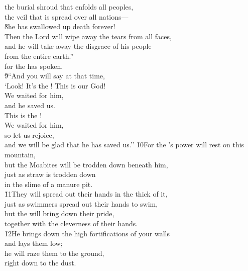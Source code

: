 \begin{poetry}
\poemll    the burial shroud that enfolds all peoples, \\
\poeml the veil that is spread over all nations--- \\
\poeml \v{8}he has swallowed up death forever! \\
\poeml Then the Lord  will wipe away the tears from all faces, \\
\poemll    and he will take away the disgrace of his people \\
\poemlll       from the entire earth.'' \\
\poeml for the  has spoken. \\
\poeml \v{9}``And you will say at that time, \\
\poemll    `Look! It's the ! This is our God! \\
\poeml We waited for him, \\
\poemll    and he saved us. \\
\poeml This is the ! \\
\poemll    We waited for him, \\
\poeml so let us rejoice, \\
\poemll    and we will be glad that he has saved us.''
\poeml \v{10}For the 's power will rest on this mountain, \\
\poemll    but the Moabites will be trodden down beneath him, \\
\poeml just as straw is trodden down \\
\poemll    in the slime of a manure pit. \\
\poeml \v{11}They will spread out their hands in the thick of it, \\
\poemll    just as swimmers spread out their hands to swim, \\
\poeml but the  will bring down their pride, \\
\poemll    together with the cleverness of their hands. \\
\poeml \v{12}He brings down the high fortifications of your walls \\
\poemll    and lays them low; \\
\poeml he will raze them to the ground, \\
\poemll    right down to the dust.
\end{poetry}

